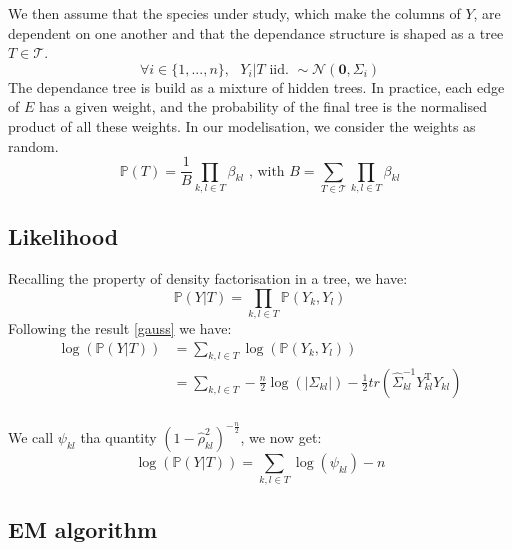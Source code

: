 \documentclass[a4paper,11pt]{article}
\begin{document}
  We then assume that the species under study, which make the columns of $Y$, are dependent on one another and that the dependance structure
  is shaped as a tree $T\in\mathcal{T}$.\\
  \[\forall i\in\{1,...,n\},\text{  }Y_i|T \text{ iid. } \sim \mathcal{N}(\mathbf{0},\Sigma_i)\]
  The dependance tree is build as a mixture of hidden trees. In practice, each edge of $E$ has a given weight, and the probability of the final
  tree is the normalised product of all these weights. In our modelisation, we consider the weights as random.
  \[ \mathds{P}(T) = \frac{1}{B}\prod_{k,l\in T} \beta_{kl} \text{ , with } B = \sum_{T\in\mathcal{T}} \prod_{k,l\in T} \beta_{kl} \]
  
  \subsection{Likelihood}
  Recalling the property of density factorisation in a tree, we have:
  \[\mathds{P}(Y|T) = \prod_{k,l\in T}\mathds{P}(Y_k,Y_l)\]
  Following the result \ref{gauss} we have:
  \begin{align*}
   \log(\mathds{P}(Y|T)) &= \sum_{k,l\in T} \log(\mathds{P}(Y_k,Y_l))\\
   &= \sum_{k,l\in T} -\frac{n}{2} \log (|\Sigma_{kl}|) - \frac{1}{2}tr(\hat{\Sigma}_{kl}^{-1} Y_{kl}^{\text{T}}Y_{kl})\\
  \end{align*}

We call $\psi_{kl}$ tha quantity $(1-\hat{\rho}_{kl}^2)^{-\frac{n}{2}}$, we now get:
\[ \log(\mathds{P}(Y|T))=\sum_{k,l\in T} \log(\psi_{kl}) -n\]
  \subsection{EM algorithm}
\end{document}
